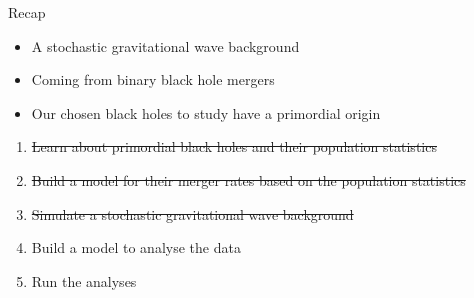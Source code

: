 \begin{frame}{Recap}
	\begin{itemize}
		\item A stochastic gravitational wave background
		\item Coming from binary black hole mergers
		\item Our chosen black holes to study have a primordial origin
	\end{itemize}
	\vskip 1cm
	\begin{enumerate}
		\item \sout{Learn about primordial black holes and their population statistics}
		\item \sout{Build a model for their merger rates based on the population statistics}
		\item \sout{Simulate a stochastic gravitational wave background}
		\item Build a model to analyse the data
		\item Run the analyses
	\end{enumerate}
\end{frame}